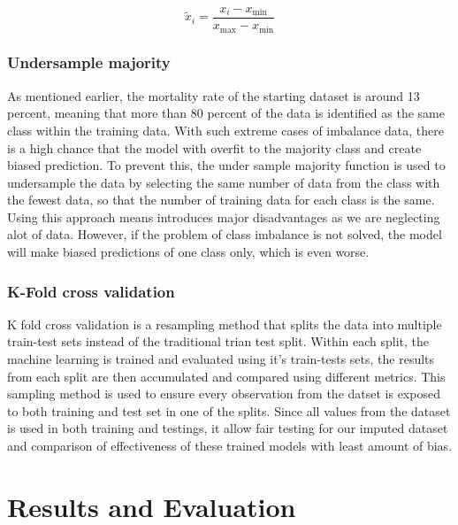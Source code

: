 \documentclass{l4proj}
\begin{document}
\begin{equation} \label{eq:1}
\tilde{x}_i=\frac{x_i - x_\text{min}}{x_\text{max} - x_\text{min}}
\end{equation}


\subsection{Undersample majority}

As mentioned earlier, the mortality rate of the starting dataset is around 13 percent, meaning that more than 80 percent of the data is identified as the same class within the training data. With such extreme cases of imbalance data, there is a high chance that the model with overfit to the majority class and create biased prediction. To prevent this, the under sample majority function is used to undersample the data by selecting the same number of data from the class with the fewest data, so that the number of training data for each class is the same. Using this approach means introduces major disadvantages as we are neglecting alot of data. However, if the problem of class imbalance is not solved, the model will make biased predictions of one class only, which is even worse.

\subsection{K-Fold cross validation}

K fold cross validation is a resampling method that splits the data into multiple train-test sets instead of the traditional trian test split. Within each split, the machine learning is trained and evaluated using it's train-tests sets, the results from each split are then accumulated and compared using different metrics.  This sampling method is used to ensure every observation from the datset is exposed to both training and test set in one of the splits. Since all values from the dataset is used in both training and testings, it allow fair testing for our imputed dataset and comparison of effectiveness of these trained models with least amount of bias.



\chapter{Results and Evaluation} 
\end{document}
